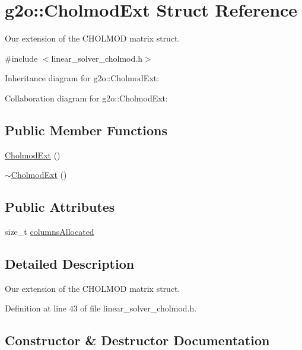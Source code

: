 \hypertarget{structg2o_1_1CholmodExt}{}\section{g2o\+:\+:Cholmod\+Ext Struct Reference}
\label{structg2o_1_1CholmodExt}


Our extension of the C\+H\+O\+L\+M\+OD matrix struct.  




{\ttfamily \#include $<$linear\+\_\+solver\+\_\+cholmod.\+h$>$}



Inheritance diagram for g2o\+:\+:Cholmod\+Ext\+:


Collaboration diagram for g2o\+:\+:Cholmod\+Ext\+:
\subsection*{Public Member Functions}
\begin{DoxyCompactItemize}
\item 
\hyperlink{structg2o_1_1CholmodExt_a1766740b74df990243cc540eacd8f4fc}{Cholmod\+Ext} ()
\item 
\hyperlink{structg2o_1_1CholmodExt_a6f851b01b5f54da6d1a03e624ed97e50}{$\sim$\+Cholmod\+Ext} ()
\end{DoxyCompactItemize}
\subsection*{Public Attributes}
\begin{DoxyCompactItemize}
\item 
size\+\_\+t \hyperlink{structg2o_1_1CholmodExt_a17fb33389283164f05225ed9670cb8c1}{columns\+Allocated}
\end{DoxyCompactItemize}


\subsection{Detailed Description}
Our extension of the C\+H\+O\+L\+M\+OD matrix struct. 

Definition at line 43 of file linear\+\_\+solver\+\_\+cholmod.\+h.



\subsection{Constructor \& Destructor Documentation}
